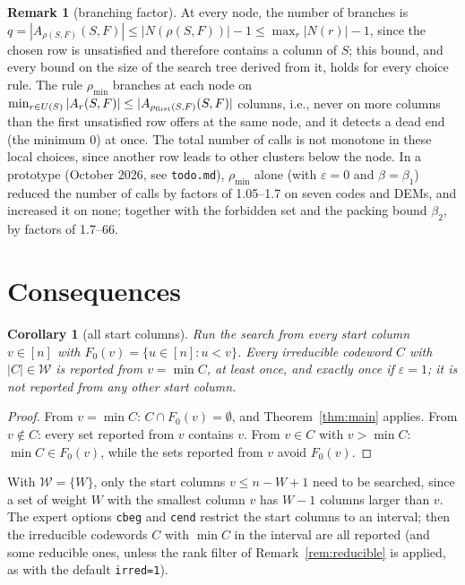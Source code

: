 \documentclass[11pt]{article}
\newtheorem{corollary}[theorem]{Corollary}
\theoremstyle{definition}
\newtheorem{remark}[theorem]{Remark}
\newcommand{\Wr}{\mathcal{W}}   %
\newcommand{\ttt}[1]{\texttt{#1}}
\begin{document}
\begin{remark}[branching factor]\label{rem:branching}
At every node, the number of branches is $q=|A_{\rho(S,F)}(S,F)|\le|N(\rho(S,F))|-1\le\max_r|N(r)|-1$, since the
chosen row is unsatisfied and therefore contains a column of $S$; this bound, and every bound on the size of the
search tree derived from it, holds for every choice rule. The rule $\rho_{\min}$ branches at each node on
$\min_{r\in U(S)}|A_r(S,F)|\le|A_{\rho_{\rm first}(S,F)}(S,F)|$ columns, i.e., never on more columns than the first
unsatisfied row offers at the same node, and it detects a dead end (the minimum $0$) at once. The total number of calls
is not monotone in these local choices, since another row leads to other clusters below the node. In a prototype
(October 2026, see \ttt{todo.md}), $\rho_{\min}$ alone (with $\varepsilon=0$ and $\beta=\beta_1$) reduced the number of
calls by factors of 1.05--1.7 on seven codes and DEMs, and increased it on none; together with the forbidden set and
the packing bound $\beta_2$, by factors of 1.7--66.
\end{remark}

\section{Consequences}\label{sec:consequences}

\begin{corollary}[all start columns]\label{cor:roots}
Run the search from every start column $v\in[n]$ with $F_0(v)=\{u\in[n]:u<v\}$. Every irreducible codeword $C$ with
$|C|\in\Wr$ is reported from $v=\min C$, at least once, and exactly once if $\varepsilon=1$; it is not reported from
any other start column.
\end{corollary}

\begin{proof}
From $v=\min C$: $C\cap F_0(v)=\emptyset$, and Theorem~\ref{thm:main} applies. From $v\notin C$: every set reported
from $v$ contains $v$. From $v\in C$ with $v>\min C$: $\min C\in F_0(v)$, while the sets reported from $v$ avoid
$F_0(v)$.
\end{proof}

With $\Wr=\{W\}$, only the start columns $v\le n-W+1$ need to be searched, since a set of weight $W$ with the
smallest column $v$ has $W-1$ columns larger than $v$. The expert options \ttt{cbeg} and \ttt{cend} restrict the start
columns to an interval; then the irreducible codewords $C$ with $\min C$ in the interval are all reported (and some
reducible ones, unless the rank filter of Remark~\ref{rem:reducible} is applied, as with the default \ttt{irred=1}).
\end{document}
